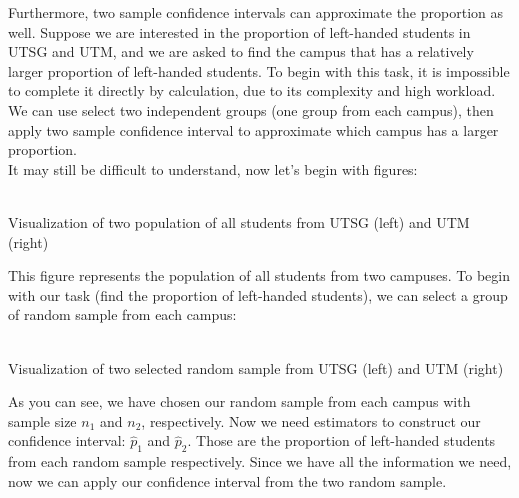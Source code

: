 Furthermore, two sample confidence intervals can approximate the proportion as well. Suppose we are interested in the proportion of left-handed students in UTSG and UTM, and we are asked to find the campus that has a relatively larger proportion of left-handed students. To begin with this task, it is impossible to complete it directly by calculation, due to its complexity and high workload. We can use select two independent groups (one group from each campus), then apply two sample confidence interval to approximate which campus has a larger proportion.\\

It may still be difficult to understand, now let's begin with figures:

\begin{center}
\vspace{0.5em}
\small\textbf{}\\Visualization of two population of all students from UTSG (left) and UTM (right)
\end{center}

This figure represents the population of all students from two campuses. To begin with our task (find the proportion of left-handed students), we can select a group of random sample from each campus:

\begin{center}
\vspace{0.5em}
\small\textbf{}\\Visualization of two selected random sample from UTSG (left) and UTM (right)
\end{center}

As you can see, we have chosen our random sample from each campus with sample size $n_1$ and $n_2$, respectively. Now we need estimators to construct our confidence interval: $\hat{p}_1$ and $\hat{p}_2$. Those are the proportion of left-handed students from each random sample respectively. Since we have all the information we need, now we can apply our confidence interval from the two random sample.

